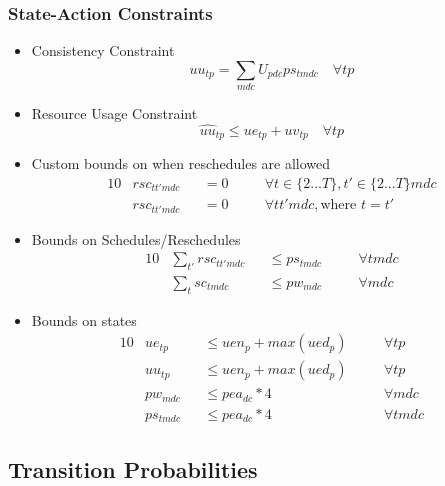 \documentclass{article}
\begin{document}
\subsubsection{State-Action Constraints}
\label{state-action constraints}
\begin{itemize}
	
	\item Consistency Constraint
	\begin{equation}
		uu_{tp} = \sum_{mdc} U_{pdc} ps_{tmdc} \quad \forall tp
	\end{equation}
	\item Resource Usage Constraint
	\begin{equation}
		\hat{uu}_{tp} \le ue_{tp}+uv_{tp} \quad \forall tp
	\end{equation}
	
	\item Custom bounds on when reschedules are allowed
	\begin{alignat}{10}
		& rsc_{tt'mdc} && = 0 \quad && \forall t \in \{ 2...T \}, t' \in \{2...T\} mdc \\
		& rsc_{tt'mdc} && = 0 \quad && \forall tt'mdc, \text{where } t=t' 
	\end{alignat}  
	
	\item Bounds on Schedules/Reschedules
	\begin{alignat}{10}
		& \sum_{t'} rsc_{tt'mdc} 	&& \le ps_{tmdc} \quad  && \forall tmdc  \\
		& \sum_{t} sc_{tmdc} 		&& \le pw_{mdc} \quad 	&& \forall mdc 
	\end{alignat}  
	
	\item Bounds on states
	\begin{alignat}{10}
		& ue_{tp} 	&& \le uen_{p} + max(ued_p) \quad 	&& \forall tp \\
		& uu_{tp} 	&& \le uen_{p} + max(ued_p) \quad 	&& \forall tp \\
		& pw_{mdc} 	&& \le pea_{dc} * 4 \quad 			&& \forall mdc \\
		& ps_{tmdc} && \le pea_{dc} * 4 \quad 			&& \forall tmdc
	\end{alignat}
\end{itemize}

\subsection{Transition Probabilities}
\end{document}
